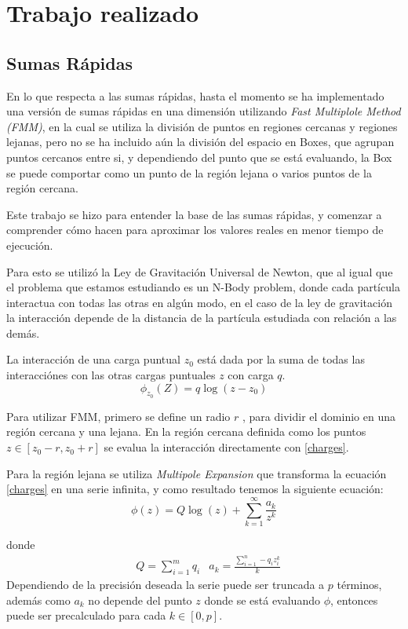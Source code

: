 \documentclass[letter, 10pt]{article}
\begin{document}
\section{Trabajo realizado}
\subsection{Sumas Rápidas}
En lo que respecta a las sumas rápidas, hasta el momento se ha implementado una versión de sumas rápidas en una dimensión utilizando \textit{Fast Multiplole Method (FMM)}, en la cual se utiliza la división de puntos en regiones cercanas y regiones lejanas, pero no se ha incluido aún la división del espacio en Boxes, que agrupan puntos cercanos entre si, y dependiendo del punto que se está evaluando, la Box se puede comportar como un punto de la región lejana o varios puntos de la región cercana.


Este trabajo se hizo para entender la base de las sumas rápidas, y comenzar a comprender cómo hacen para aproximar los valores reales en menor tiempo de ejecución.

Para esto se utilizó la Ley de Gravitación Universal de Newton, que al igual que el problema que estamos estudiando es un N-Body problem, donde cada partícula interactua con todas las otras en algún modo, en el caso de la ley de gravitación la interacción depende de la distancia de la partícula estudiada con relación a las demás.

La interacción de una carga puntual $z_0$ está dada por la suma de todas las interacciónes con las otras cargas puntuales $z$ con carga $q$.
\begin{equation}
\phi_{z_0}(Z) = q \log(z-z_0) \label{charges}
\end{equation}          

Para utilizar FMM, primero se define un radio $r$ , para dividir el dominio en una región cercana y una lejana. En la región cercana definida como los puntos $z \in [z_0 - r , z_0+ r]$ se evalua la interacción directamente con \ref{charges}. 

Para la región lejana se utiliza \textit{Multipole Expansion} que transforma la ecuación \ref{charges} en una serie infinita, y como resultado tenemos la siguiente ecuación:
\begin{equation}
\phi(z) = Q \log(z) + \sum_{k=1}^\infty \frac{a_k}{z^k}
\end{equation}

donde 
\begin{align*}
    &Q = \sum_{i = 1}^m q_i    &a_k = \frac{\sum_{i = 1}^n -q_i z_i^k}{k}
\end{align*}
Dependiendo de la precisión deseada la serie puede ser truncada a $p$ términos, además como $a_k$ no depende del punto $z$ donde se está evaluando $\phi$, entonces puede ser precalculado para cada $k \in [0,p]$.
\end{document}
